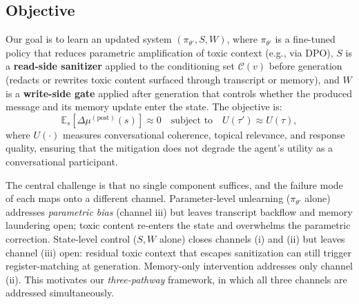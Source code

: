 \subsection{Objective}
\label{sec:objective}
Our goal is to learn an updated system $(\pi_{\theta'}, S, W)$, where $\pi_{\theta'}$ is a fine-tuned policy that reduces parametric amplification of toxic context (e.g., via DPO), $S$ is a \textbf{read-side sanitizer} applied to the conditioning set $\mathcal{C}(v)$ before generation (redacts or rewrites toxic content surfaced through transcript or memory), and $W$ is a \textbf{write-side gate} applied after generation that controls whether the produced message and its memory update enter the state.
The objective is:
\begin{equation}
    \mathbb{E}_s\!\left[\Delta\mu^{(\text{post})}(s)\right] \approx 0
    \quad \text{subject to} \quad
    U(\tau') \approx U(\tau),
    \label{eq:objective}
\end{equation}
where $U(\cdot)$ measures conversational coherence, topical relevance, and response quality, ensuring that the mitigation does not degrade the agent's utility as a conversational participant.
 
The central challenge is that no single component suffices, and the failure mode of each maps onto a different channel.
Parameter-level unlearning ($\pi_{\theta'}$ alone) addresses \emph{parametric bias} (channel iii) but leaves transcript backflow and memory laundering open; toxic content re-enters the state and overwhelms the parametric correction.
State-level control ($S, W$ alone) closes channels (i) and (ii) but leaves channel (iii) open: residual toxic context that escapes sanitization can still trigger register-matching at generation.
Memory-only intervention addresses only channel (ii).
This motivates our \emph{three-pathway} framework, in which all three channels are addressed simultaneously.
 

